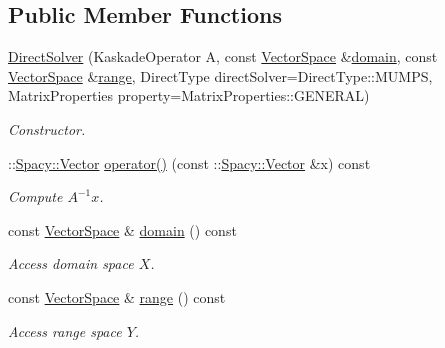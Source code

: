 \subsection*{Public Member Functions}
\begin{DoxyCompactItemize}
\item 
\hyperlink{classSpacy_1_1Kaskade_1_1DirectSolver_a52ed83fd0cd00bc57d4f09963dfe2e98_a52ed83fd0cd00bc57d4f09963dfe2e98}{Direct\+Solver} (Kaskade\+Operator A, const \hyperlink{classSpacy_1_1VectorSpace}{Vector\+Space} \&\hyperlink{classSpacy_1_1OperatorBase_a2588f9b3e0188820c4c494e63293dc6f_a2588f9b3e0188820c4c494e63293dc6f}{domain}, const \hyperlink{classSpacy_1_1VectorSpace}{Vector\+Space} \&\hyperlink{classSpacy_1_1OperatorBase_ab19d3b7a6f290b1079248f1e567e53d6_ab19d3b7a6f290b1079248f1e567e53d6}{range}, Direct\+Type direct\+Solver=Direct\+Type\+::\+M\+U\+M\+P\+S, Matrix\+Properties property=Matrix\+Properties\+::\+G\+E\+N\+E\+R\+A\+L)
\begin{DoxyCompactList}\small\item\em Constructor. \end{DoxyCompactList}\item 
\hypertarget{classSpacy_1_1Kaskade_1_1DirectSolver_ae3b85c906968d662c23bdde7df96ca87}{}\+::\hyperlink{classSpacy_1_1Vector}{Spacy\+::\+Vector} \hyperlink{classSpacy_1_1Kaskade_1_1DirectSolver_ae3b85c906968d662c23bdde7df96ca87}{operator()} (const \+::\hyperlink{classSpacy_1_1Vector}{Spacy\+::\+Vector} \&x) const \label{classSpacy_1_1Kaskade_1_1DirectSolver_ae3b85c906968d662c23bdde7df96ca87}

\begin{DoxyCompactList}\small\item\em Compute $A^{-1}x$. \end{DoxyCompactList}\item 
const \hyperlink{classSpacy_1_1VectorSpace}{Vector\+Space} \& \hyperlink{classSpacy_1_1OperatorBase_a2588f9b3e0188820c4c494e63293dc6f_a2588f9b3e0188820c4c494e63293dc6f}{domain} () const 
\begin{DoxyCompactList}\small\item\em Access domain space $X$. \end{DoxyCompactList}\item 
const \hyperlink{classSpacy_1_1VectorSpace}{Vector\+Space} \& \hyperlink{classSpacy_1_1OperatorBase_ab19d3b7a6f290b1079248f1e567e53d6_ab19d3b7a6f290b1079248f1e567e53d6}{range} () const 
\begin{DoxyCompactList}\small\item\em Access range space $Y$. \end{DoxyCompactList}\end{DoxyCompactItemize}


